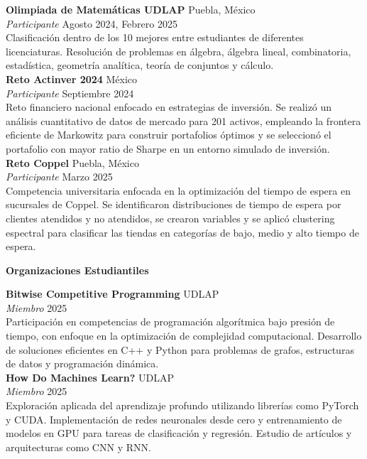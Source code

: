 \documentclass[8pt]{extarticle} %
\begin{document}
\textbf{Olimpiada de Matemáticas UDLAP} \hfill Puebla, México\\  
\textit{Participante} \hfill Agosto 2024,  Febrero 2025\\  
Clasificación dentro de los 10 mejores entre estudiantes de diferentes licenciaturas. Resolución de problemas en álgebra, álgebra lineal, combinatoria, estadística, geometría analítica, teoría de conjuntos y cálculo.\\

\textbf{Reto Actinver 2024} \hfill México\\  
\textit{Participante} \hfill Septiembre 2024\\  
Reto financiero nacional enfocado en estrategias de inversión. Se realizó un análisis cuantitativo de datos de mercado para 201 activos, empleando la frontera eficiente de Markowitz para construir portafolios óptimos y se seleccionó el portafolio con mayor ratio de Sharpe en un entorno simulado de inversión.\\

\textbf{Reto Coppel} \hfill Puebla, México\\  
\textit{Participante} \hfill Marzo 2025\\  
Competencia universitaria enfocada en la optimización del tiempo de espera en sucursales de Coppel. Se identificaron distribuciones de tiempo de espera por clientes atendidos y no atendidos, se crearon variables y se aplicó clustering espectral para clasificar las tiendas en categorías de bajo, medio y alto tiempo de espera. \\

\begin{center}
\vspace{1ex}
\textbf{Organizaciones Estudiantiles}
\vspace{-1ex}
\end{center}

\textbf{Bitwise Competitive Programming} \hfill UDLAP \\
\textit{Miembro} \hfill 2025 \\
Participación en competencias de programación algorítmica bajo presión de tiempo, con enfoque en la optimización de complejidad computacional. Desarrollo de soluciones eficientes en C++ y Python para problemas de grafos, estructuras de datos y programación dinámica. \\

\textbf{How Do Machines Learn?} \hfill UDLAP \\
\textit{Miembro} \hfill 2025 \\
Exploración aplicada del aprendizaje profundo utilizando librerías como PyTorch y CUDA. Implementación de redes neuronales desde cero y entrenamiento de modelos en GPU para tareas de clasificación y regresión. Estudio de artículos y arquitecturas como CNN y RNN. \\
\end{document}
